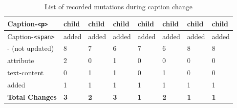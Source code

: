 \documentclass[a4paper, 10pt]{article}
\begin{document}
\begin{table}[!ht]
\begin{adjustbox}{angle=90}
\begin{tabular}{|l|l|l|l|l|l|l|l|}
      Caption-\verb|<p>|              & child             & child           & child             & child         & child           & child           & child           \\ \hline
      Caption-\verb|<span>|           & added             & added           & added             & added         & added           & added           & added           \\ \hline
      \hline
      - (not updated)                 & 8                 & 7               & 6                 & 7             & 6               & 8               & 8               \\ \hline
      \hline
      attribute                       & 2                 & 0               & 1                 & 0             & 0               & 0               & 0               \\ \hline
      text-content                    & 0                 & 1               & 1                 & 0             & 1               & 0               & 0               \\ \hline
      added                           & 1                 & 1               & 1                 & 1             & 1               & 1               & 1               \\ \hline
      \hline
      \textbf{Total Changes}          & \textbf{3}        & \textbf{2}      & \textbf{3}        & \textbf{1}    & \textbf{2}      & \textbf{1}      & \textbf{1}      \\ \hline
    \end{tabular}
  \end{adjustbox}
  \caption{List of recorded mutations during caption change}
  \label{tab:mutations:captionChange}
\end{table}
\end{document}
